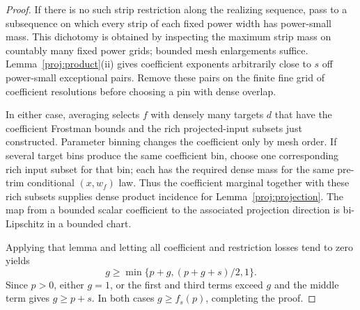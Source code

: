 \begin{proof}
If there is no such strip restriction along the realizing
sequence, pass to a subsequence on which every strip of each
fixed power width has power-small mass. This dichotomy is
obtained by inspecting the maximum strip mass on countably
many fixed power grids; bounded mesh enlargements suffice.
Lemma~\ref{proj:product}(ii) gives coefficient exponents
arbitrarily close to $s$ off power-small exceptional pairs.
Remove these pairs on the finite fine grid of coefficient
resolutions before choosing a pin with dense overlap.

In either case, averaging selects $f$ with densely many
targets $d$ that have the coefficient Frostman bounds and
the rich projected-input subsets just constructed. Parameter
binning changes the coefficient only by mesh order. If
several target bins produce the same coefficient bin, choose
one corresponding rich input subset for that bin; each has
the required dense mass for the same pre-trim conditional
$(x,w_f)$ law. Thus the coefficient marginal together with
these rich subsets supplies dense product incidence for
Lemma~\ref{proj:projection}. The map from a bounded scalar
coefficient to the associated projection direction is
bi-Lipschitz in a bounded chart.

Applying that lemma and letting all coefficient and
restriction losses tend to zero yields
\[
 g\ge\min\{p+g,(p+g+s)/2,1\}.
\]
Since $p>0$, either $g=1$, or the first and third terms
exceed $g$ and the middle term gives $g\ge p+s$. In both
cases $g\ge f_s(p)$, completing the proof.
\end{proof}
